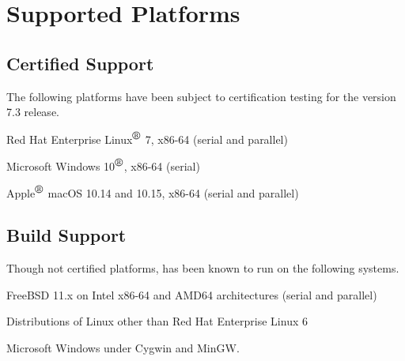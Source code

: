 \documentclass[letterpaper]{scrartcl}
\begin{document}
\newpage
\section{Supported Platforms}
\subsection*{Certified Support}
The following platforms have been subject to certification testing for the
\Xyce{} version 7.3 release.
\begin{XyceItemize}
  \item Red Hat Enterprise Linux${}^{\mbox{\textregistered}}$ 7, x86-64 (serial and parallel)
  \item Microsoft Windows 10${}^{\mbox{\textregistered}}$, x86-64 (serial)
  \item Apple${}^{\mbox{\textregistered}}$ macOS 10.14 and 10.15, x86-64 (serial and parallel)
\end{XyceItemize}


\subsection*{Build Support}
Though not certified platforms, \Xyce{} has been known to run on the following
systems.
\begin{XyceItemize}
  \item FreeBSD 11.x on Intel x86-64 and AMD64 architectures (serial
    and parallel)
  \item Distributions of Linux other than Red Hat Enterprise Linux 6
  \item Microsoft Windows under Cygwin and MinGW.
\end{XyceItemize}
\end{document}
